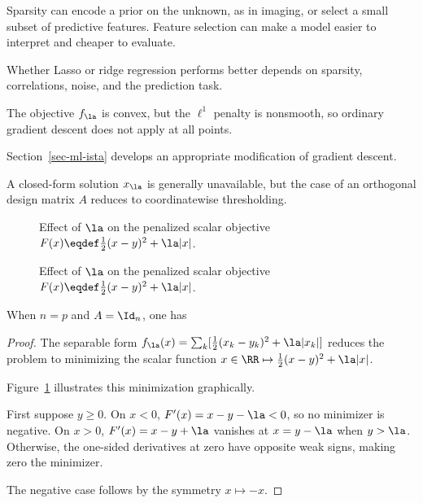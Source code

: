 Sparsity can encode a prior on the unknown, as in imaging, or select a small subset of predictive features. Feature selection can make a model easier to interpret and cheaper to evaluate.
 
Whether Lasso or ridge regression performs better depends on sparsity, correlations, noise, and the prediction task.

The objective $f_\la$ is convex, but the $\ell^1$ penalty is nonsmooth, so ordinary gradient descent does not apply at all points.
 
Section~\ref{sec-ml-ista} develops an appropriate modification of gradient descent.
 
A closed-form solution $x_\la$ is generally unavailable, but the case of an orthogonal design matrix $A$ reduces to coordinatewise thresholding.



\begin{figure}[tbp]
\centering
{}\hfill
{}
\caption{Effect of $\la$ on the penalized scalar objective $F(x)\eqdef\frac12(x-y)^2+\la|x|$.}
\label{fig-ml-varspars}
\end{figure}
\begin{figure}[tbp]
\BookContinuedFigure
\centering
{}\hfill
{}
\caption{Effect of $\la$ on the penalized scalar objective $F(x)\eqdef\frac12(x-y)^2+\la|x|$.}
\label{fig-ml-varspars-continued}
\end{figure}


\begin{prop}\label{prop-soft-tresdh}
	When $n=p$ and $A=\Id_n$, one has
\end{prop}
\begin{proof}
	The separable form $f_\la(x)=\sum_k[\frac12(x_k-y_k)^2+\la|x_k|]$ reduces the problem to minimizing the scalar
	function $x \in \RR \mapsto \frac{1}{2}(x-y)^2 + \la |x|$. 
	 
	Figure~\ref{fig-ml-varspars} illustrates this minimization graphically.
	  
	First suppose $y\geq0$. On $x<0$, $F'(x)=x-y-\la<0$, so no minimizer is negative. On $x>0$, $F'(x)=x-y+\la$ vanishes at $x=y-\la$ when $y>\la$. Otherwise, the one-sided derivatives at zero have opposite weak signs, making zero the minimizer.
	 
	The negative case follows by the symmetry $x \mapsto -x$.
\end{proof}

